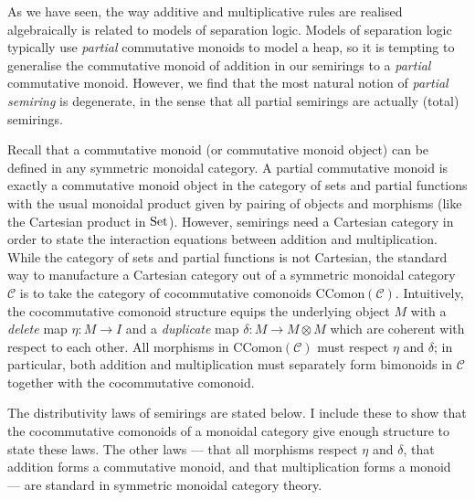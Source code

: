As we have seen, the way additive and multiplicative rules are
realised algebraically is related to models of separation logic.
Models of separation logic typically use \emph{partial} commutative monoids to
model a heap, so it is tempting to generalise the commutative monoid of
addition in our semirings to a \emph{partial} commutative monoid.
However, we find that the most natural notion of \emph{partial semiring} is
degenerate, in the sense that all partial semirings are actually (total)
semirings.

Recall that a commutative monoid (or commutative monoid object) can be
defined in any symmetric monoidal category.
A partial commutative monoid is exactly a commutative monoid object in the
category of sets and partial functions with the usual monoidal product given
by pairing of objects and morphisms (like the Cartesian product in $\operatorname{Set}$).
However, semirings need a Cartesian category in order to state the interaction
equations between addition and multiplication.
While the category of sets and partial functions is not Cartesian, the
standard way to manufacture a Cartesian category out of a symmetric monoidal
category $\mathcal C$ is to take the category of cocommutative comonoids
$\mathrm{CComon}(\mathcal C)$.
Intuitively, the cocommutative comonoid structure equips the underlying
object $M$ with a \emph{delete} map $\eta : M \to I$ and a \emph{duplicate}
map $\delta : M \to M \otimes M$ which are coherent with respect to each other.
All morphisms in $\mathrm{CComon}(\mathcal C)$ must respect $\eta$ and
$\delta$; in particular, both addition and multiplication must separately
form bimonoids in $\mathcal C$ together with the cocommutative comonoid.

The distributivity laws of semirings are stated below.
I include these to show that the cocommutative comonoids of a monoidal category
give enough structure to state these laws.
The other laws --- that all morphisms respect $\eta$ and $\delta$, that addition
forms a commutative monoid, and that multiplication forms a monoid --- are
standard in symmetric monoidal category theory.

